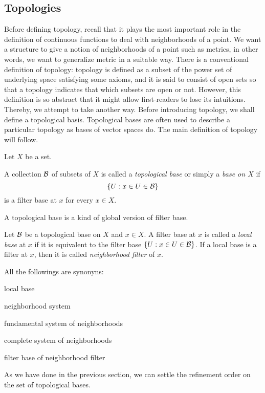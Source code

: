 \documentclass{../crs}
\begin{document}
\subsection{Topologies}
Before defining topology, recall that it plays the most important role in the definition of continuous functions to deal with neighborhoods of a point.
We want a structure to give a notion of neighborhoods of a point such as metrics, in other words, we want to generalize metric in a suitable way.
There is a conventional definition of topology: topology is defined as a subset of the power set of underlying space satisfying some axioms, and it is said to consist of open sets so that a topology indicates that which subsets are open or not.
However, this definition is so abstract that it might allow first-readers to lose its intuitions.
Thereby, we attempt to take another way.
Before introducing topology, we shall define a topological basis.
Topological bases are often used to describe a particular topology as bases of vector spaces do.
The main definition of topology will follow.

Let $X$ be a set.
\begin{defn}
A collection $\mathcal{B}$ of subsets of $X$ is called a \emph{topological base} or simply a \emph{base on $X$} if
\[\{U:x\in U\in\mathcal{B}\}\]
is a filter base at $x$ for every $x\in X$.
\end{defn}

A topological base is a kind of global version of filter base.

\begin{defn}
Let $\mathcal{B}$ be a topological base on $X$ and $x\in X$.
A filter base at $x$ is called a \emph{local base} at $x$ if it is equivalent to the filter base $\{U:x\in U\in\mathcal{B}\}$.
If a local base is a filter at $x$, then it is called \emph{neighborhood filter} of $x$.
\end{defn}
All the followings are synonyns:
\begin{cond}
\item local base
\item neighborhood system
\item fundamental system of neighborhoods
\item complete system of neighborhoods
\item filter base of neighborhood filter
\end{cond}

As we have done in the previous section, we can settle the refinement order on the set of topological bases.
\end{document}
